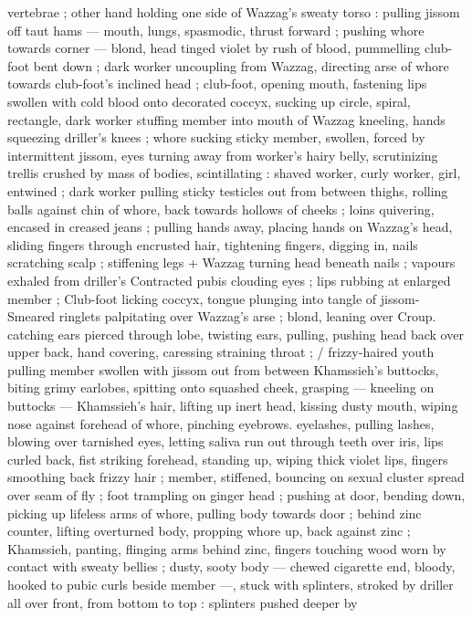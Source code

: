 vertebrae ; other hand holding one side of Wazzag's sweaty torso :
pulling jissom off taut hams --- mouth, lungs, spasmodic, thrust
forward ; pushing whore towards corner --- blond, head tinged violet
by rush of blood, pummelling club-foot bent down ; dark worker
uncoupling from Wazzag, directing arse of whore towards club-foot's
inclined head ; club-foot, opening mouth, fastening lips swollen with
cold blood onto decorated coccyx, sucking up circle, spiral,
rectangle, dark worker stuffing member into mouth of Wazzag
kneeling, hands squeezing driller's knees ; whore sucking sticky
member, swollen, forced by intermittent jissom, eyes turning away
from worker's hairy belly, scrutinizing trellis crushed by mass of
bodies, scintillating : shaved worker, curly worker, girl, entwined ;
dark worker pulling sticky testicles out from between thighs, rolling
balls against chin of whore, back towards hollows of cheeks ; loins
quivering, encased in creased jeans ; pulling hands away, placing
hands on Wazzag’s head, sliding fingers through encrusted hair,
tightening fingers, digging in, nails scratching scalp ; stiffening legs
+ Wazzag turning head beneath nails ; vapours exhaled from driller's
Contracted pubis clouding eyes ; lips rubbing at enlarged member ;
Club-foot licking coccyx, tongue plunging into tangle of jissom-
Smeared ringlets palpitating over Wazzag's arse ; blond, leaning over
Croup. catching ears pierced through lobe, twisting ears, pulling,
pushing head back over upper back, hand covering, caressing
straining throat ; / frizzy-haired youth pulling member swollen with
jissom out from between Khamssieh's buttocks, biting grimy
earlobes, spitting onto squashed cheek, grasping --- kneeling on
buttocks --- Khamssieh's hair, lifting up inert head, kissing dusty
mouth, wiping nose against forehead of whore, pinching eyebrows.
eyelashes, pulling lashes, blowing over tarnished eyes, letting saliva
run out through teeth over iris, lips curled back, fist striking
forehead, standing up, wiping thick violet lips, fingers smoothing
back frizzy hair ; member, stiffened, bouncing on sexual cluster
spread over seam of fly ; foot trampling on ginger head ; pushing at
door, bending down, picking up lifeless arms of whore, pulling body
towards door ; behind zinc counter, lifting overturned body, propping
whore up, back against zinc ; Khamssieh, panting, flinging arms
behind zinc, fingers touching wood worn by contact with sweaty
bellies ; dusty, sooty body --- chewed cigarette end, bloody, hooked
to pubic curls beside member ---, stuck with splinters, stroked by
driller all over front, from bottom to top : splinters pushed deeper by
